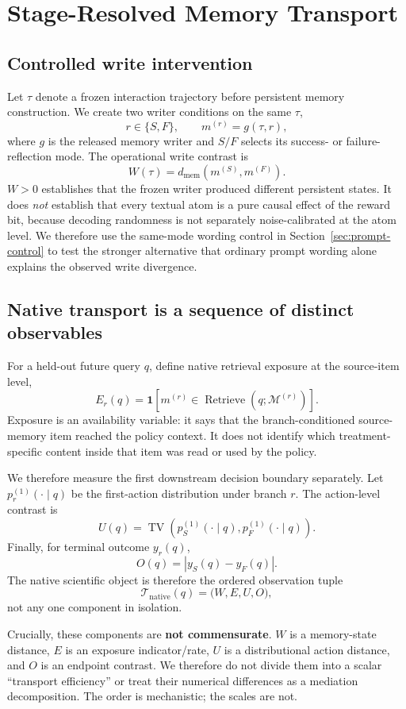 \section{Stage-Resolved Memory Transport}
\label{sec:mechanism}

\subsection{Controlled write intervention}
Let $\tau$ denote a frozen interaction trajectory before persistent memory construction. We create two writer conditions on the same $\tau$,
\[
  r\in\{S,F\}, \qquad m^{(r)} = g(\tau,r),
\]
where $g$ is the released memory writer and $S/F$ selects its success- or failure-reflection mode. The operational write contrast is
\[
  W(\tau)=d_{\mathrm{mem}}\!\left(m^{(S)},m^{(F)}\right).
\]
$W>0$ establishes that the frozen writer produced different persistent states. It does \emph{not} establish that every textual atom is a pure causal effect of the reward bit, because decoding randomness is not separately noise-calibrated at the atom level. We therefore use the same-mode wording control in Section~\ref{sec:prompt-control} to test the stronger alternative that ordinary prompt wording alone explains the observed write divergence.

\subsection{Native transport is a sequence of distinct observables}
For a held-out future query $q$, define native retrieval exposure at the source-item level,
\[
 E_r(q)=\mathbf{1}[m^{(r)}\in\operatorname{Retrieve}(q;\mathcal{M}^{(r)})].
\]
Exposure is an availability variable: it says that the branch-conditioned source-memory item reached the policy context. It does not identify which treatment-specific content inside that item was read or used by the policy.

We therefore measure the first downstream decision boundary separately. Let $p_r^{(1)}(\cdot\mid q)$ be the first-action distribution under branch $r$. The action-level contrast is
\[
 U(q)=\operatorname{TV}\!\left(p_S^{(1)}(\cdot\mid q),p_F^{(1)}(\cdot\mid q)\right).
\]
Finally, for terminal outcome $y_r(q)$,
\[
 O(q)=\left|y_S(q)-y_F(q)\right|.
\]
The native scientific object is therefore the ordered observation tuple
\[
 \mathcal{T}_{\mathrm{native}}(q)=\big(W, E, U, O\big),
\]
not any one component in isolation.

Crucially, these components are \textbf{not commensurate}. $W$ is a memory-state distance, $E$ is an exposure indicator/rate, $U$ is a distributional action distance, and $O$ is an endpoint contrast. We therefore do not divide them into a scalar ``transport efficiency'' or treat their numerical differences as a mediation decomposition. The order is mechanistic; the scales are not.

